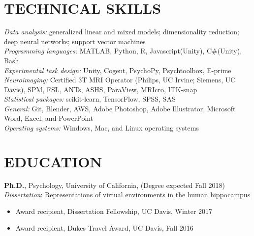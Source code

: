 \documentclass[line,margin,10pt]{res}
\begin{document}
\begin{resume}
\section{TECHNICAL SKILLS} 
\emph{Data analysis:} generalized linear and mixed models; dimensionality reduction; deep neural networks; support vector machines\\
\emph{Programming languages:} MATLAB, Python, R, Javascript(Unity), C\#(Unity), Bash\\
\emph{Experimental task design:} Unity, Cogent, PsychoPy, Psychtoolbox, E-prime  \\
\emph{Neuroimaging:} Certified 3T MRI Operator (Philips, UC Irvine; Siemens, UC Davis), SPM, FSL, ANTs, ASHS, ParaView,  MRIcro, ITK-snap \\
\emph{Statistical packages:} scikit-learn, TensorFlow, SPSS, SAS\\
\emph{General:} Git, Blender, AWS, Adobe Photoshop, Adobe Illustrator, Microsoft Word, Excel, and PowerPoint\\
\emph{Operating systems:} Windows, Mac, and Linux operating systems\\



\section{EDUCATION} 
\textbf{Ph.D.}, Psychology, University of California, (Degree expected Fall 2018)\\
\emph{Dissertation}: Representations of virtual environments in the human hippocampus\\
\begin{itemize} \itemsep -2pt
\item Award recipient, Dissertation Fellowship, UC Davis, Winter 2017
\item	Award recipient, Dukes Travel Award, UC Davis, Fall 2016
\end{itemize}


\end{resume}
\end{document}
